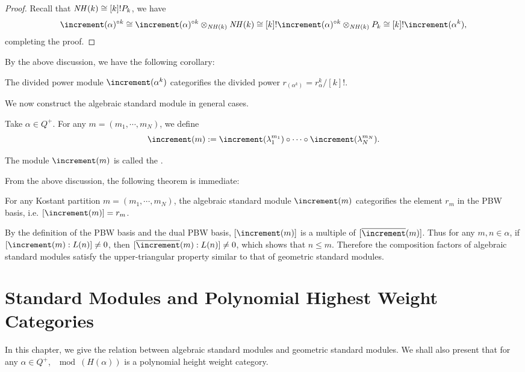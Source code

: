 \begin{proof}
    Recall that $\mathit{NH}(k)\cong [k]!P_k$, we have
    \[
        \std(\alpha)^{\circ k}\cong \std(\alpha)^{\circ k}\ox_{\NH(k)}\NH(k)
        \cong [k]!\std(\alpha)^{\circ k}\ox_{\NH(k)}P_k
        \cong[k]!\std(\alpha^k),
    \] 
    completing the proof.
\end{proof}

By the above discussion, we have the following corollary:

\begin{corollary}
    The divided power module $\std(\alpha^k)$ categorifies the divided power 
    $r_{(\alpha^k)} = r_\alpha^k/[k]!$.
\end{corollary}

We now construct the algebraic standard module in general cases.

Take $\alpha\in Q^+$. For any $m = (m_1,\cdots, m_N)$,
we define 
\[
    \std(m) := \std(\lambda_1^{m_1})\circ\cdots
    \circ\std(\lambda_N^{m_N}).
\]

\begin{definition}
    The module $\std(m)$ is called the .
\end{definition}

From the above discussion, the following theorem is immediate:

\begin{theorem}\label{std-modules}
    For any Kostant partition $m = (m_1,\cdots,m_N)$, the algebraic standard module $\std(m)$
    categorifies the element $r_m$ in the PBW basis,
    i.e. $[\std(m)] = r_m$.
\end{theorem}

\begin{remark}
    By the definition of the PBW basis and the dual PBW basis,
    $[\std(m)]$ is a multiple of $[\pstd(m)]$.
    Thus for any $m,n\in\alpha$, if $[\std(m):L(n)]\ne 0$,
    then $[\pstd(m):L(n)]\ne 0$, which shows that $n\le m$.
    Therefore the composition factors of algebraic standard modules
    satisfy the upper-triangular property similar to that of
    geometric standard modules.
\end{remark}

\chapter{Standard Modules and Polynomial Highest Weight Categories}

In this chapter, we give the relation between algebraic standard modules
and geometric standard modules. We shall also present that
for any $\alpha\in Q^+$,
$\mod(H(\alpha))$ is a polynomial height weight category.

